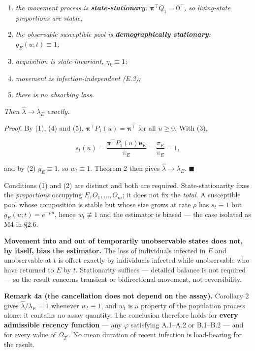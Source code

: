 \begin{enumerate}
\def\labelenumi{\arabic{enumi}.}
\tightlist
\item
  \emph{the movement process is \textbf{state-stationary}: \(\boldsymbol\pi^{\!\top}Q_1=\mathbf{0}^{\!\top}\), so living-state proportions are stable;}
\item
  \emph{the observable susceptible pool is \textbf{demographically stationary}: \(g_E(u;t)\equiv1\);}
\item
  \emph{acquisition is state-invariant, \(\eta_k\equiv1\);}
\item
  \emph{movement is infection-independent (E.3);}
\item
  \emph{there is no absorbing loss.}
\end{enumerate}

\emph{Then \(\hat\lambda\to\lambda_E\) exactly.}

\emph{Proof.} By (1), (4) and (5), \(\boldsymbol\pi^{\!\top}P_1(u)=\boldsymbol\pi^{\!\top}\) for all \(u\ge0\). With (3),

\[
s_t(u)=\frac{\boldsymbol\pi^{\!\top}P_1(u)\mathbf{e}_E}{\pi_E}=\frac{\pi_E}{\pi_E}=1 ,
\]

and by (2) \(g_E\equiv1\), so \(w_t\equiv1\). Theorem 2 then gives \(\hat\lambda\to\lambda_E\). \(\blacksquare\)

Conditions (1) and (2) are distinct and both are required. State-stationarity fixes the \emph{proportions} occupying \(E,O_1,\dots,O_m\); it does not fix the \emph{total}. A susceptible pool whose composition is stable but whose size grows at rate \(\rho\) has \(s_t\equiv1\) but \(g_E(u;t)=e^{-\rho u}\), hence \(w_t\not\equiv1\) and the estimator is biased --- the case isolated as M4 in §2.6.

\textbf{Movement into and out of temporarily unobservable states does not, by itself, bias the estimator.} The loss of individuals infected in \(E\) and unobservable at \(t\) is offset exactly by individuals infected while unobservable who have returned to \(E\) by \(t\). Stationarity suffices --- detailed balance is not required --- so the result concerns transient or bidirectional movement, not reversibility.

\textbf{Remark 4a (the cancellation does not depend on the assay).} Corollary 2 gives \(\hat\lambda/\lambda_E=1\) whenever \(w_t\equiv1\), and \(w_t\) is a property of the population process alone: it contains no assay quantity. The conclusion therefore holds for \textbf{every admissible recency function} --- any \(\varphi\) satisfying A.1--A.2 or B.1--B.2 --- and for every value of \(\Omega_{T^*}\). No mean duration of recent infection is load-bearing for the result.

